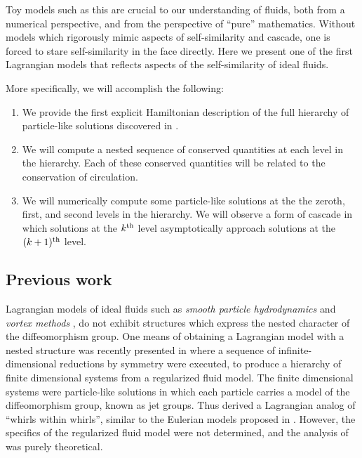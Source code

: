 \documentclass[12pt]{amsart}
\begin{document}
  Toy models such as this are crucial to our understanding of fluids,
  both from a numerical perspective, and from the perspective
  of ``pure'' mathematics.
  Without models which rigorously mimic aspects of self-similarity 
  and cascade,
  one is forced to stare self-similarity in the face directly.
  Here we present one of the first Lagrangian models that reflects aspects
  of the self-similarity of ideal fluids.

More specifically, we will accomplish the following:
\begin{enumerate}
  \item We provide the first explicit Hamiltonian description of the full hierarchy of particle-like solutions discovered in 
  	\cite{JacobsRatiuDesbrun2013,CotterHolmJacobsMeier2014}.
  \item We will compute a nested sequence of conserved quantities at 
    each level in the hierarchy.
    Each of these conserved quantities will be related to the conservation
    of circulation.
  \item We will numerically compute some particle-like solutions at the the zeroth, first, and second levels in the hierarchy.  We will observe a form of cascade in which solutions at the $k^{\rm th}$ level asymptotically approach
    solutions at the $(k+1)^{\rm th}$ level.
\end{enumerate}


\subsection{Previous work}
  Lagrangian models of ideal fluids such as \emph{smooth particle hydrodynamics} \cite{Monaghan1977,Lucy1977} and
\emph{vortex methods} \cite{Chorin1973}, do not exhibit structures which express the nested character of the diffeomorphism group.
 One means of obtaining a Lagrangian model with a nested structure
 was recently presented in \cite{JacobsRatiuDesbrun2013}
 where a sequence of infinite-dimensional reductions by symmetry were
 executed, to produce a hierarchy of finite dimensional systems from a
 regularized fluid model.
 The finite dimensional systems were particle-like solutions
 in which each particle carries a model of the diffeomorphism group,
 known as jet groups.
 Thus \cite{JacobsRatiuDesbrun2013} derived a Lagrangian analog of 
 ``whirls within whirls'', similar to the Eulerian models proposed
 in \cite{HolmTronci2012}.
 However, the specifics of the regularized fluid model were not determined,
 and the analysis of \cite{JacobsRatiuDesbrun2013} was purely
 theoretical.
 
\end{document}

